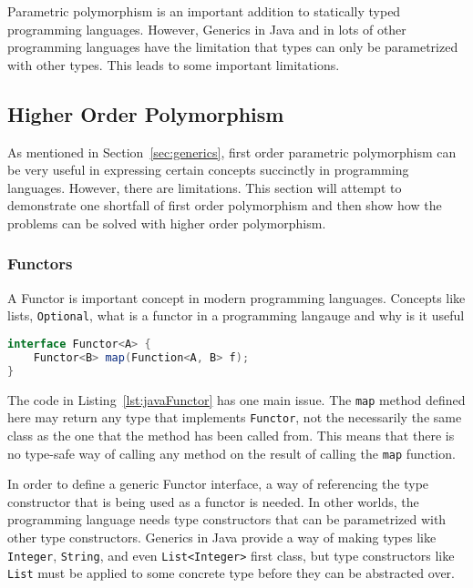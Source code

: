 Parametric polymorphism is an important addition to statically typed programming
languages. However, Generics in Java and in lots of other programming languages
have the limitation that types can only be parametrized with other types. 
This leads to some important limitations.

\subsection{Higher Order Polymorphism}
As mentioned in Section~\ref{sec:generics}, first order parametric polymorphism
can be very useful in expressing certain concepts succinctly in programming 
languages. However, there are limitations. This section will attempt to 
demonstrate one shortfall of first order polymorphism and then show how the
problems can be solved with higher order polymorphism.

\subsubsection{Functors}

A Functor is important concept in modern programming languages. Concepts like
lists, \lstinline{Optional}, 
what is a functor in a programming langauge and why is it useful

\begin{lstlisting}[caption=An attempt to define Functor in Java, language=Java, label={lst:javaFunctor}]
interface Functor<A> {
    Functor<B> map(Function<A, B> f);
}
\end{lstlisting}

The code in Listing~\ref{lst:javaFunctor} has one main issue. The \lstinline{map}
method defined here may return any type that implements \lstinline{Functor},
not the necessarily the same class as the one that the method has been called
from. This means that there is no type-safe way of calling any method on the
result of calling the \lstinline{map} function.

In order to define a generic Functor interface, a way of referencing the type
constructor that is being used as a functor is needed. In other worlds, the
programming language needs type constructors that can be parametrized with
other type constructors. Generics in Java provide a way of making types like
\lstinline{Integer}, \lstinline{String}, and even \lstinline{List<Integer>}
first class, but type constructors like \lstinline{List} must be applied to
some concrete type before they can be abstracted over.

